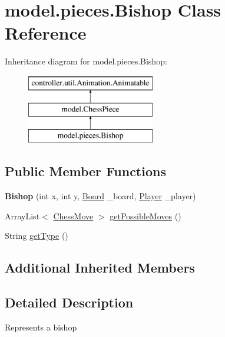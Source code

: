 \hypertarget{classmodel_1_1pieces_1_1_bishop}{\section{model.\-pieces.\-Bishop Class Reference}
\label{classmodel_1_1pieces_1_1_bishop}
}
Inheritance diagram for model.\-pieces.\-Bishop\-:\begin{figure}[H]
\begin{center}
\leavevmode
\includegraphics[height=3.000000cm]{classmodel_1_1pieces_1_1_bishop}
\end{center}
\end{figure}
\subsection*{Public Member Functions}
\begin{DoxyCompactItemize}
\item 
\hypertarget{classmodel_1_1pieces_1_1_bishop_ae2668ef3ed3019d746808223561010da}{{\bfseries Bishop} (int x, int y, \hyperlink{classmodel_1_1board_1_1_board}{Board} \-\_\-board, \hyperlink{classcontroller_1_1_player}{Player} \-\_\-player)}\label{classmodel_1_1pieces_1_1_bishop_ae2668ef3ed3019d746808223561010da}

\item 
Array\-List$<$ \hyperlink{classmodel_1_1_chess_move}{Chess\-Move} $>$ \hyperlink{classmodel_1_1pieces_1_1_bishop_a833d5968dbfb775dc72d1cadb68242b3}{get\-Possible\-Moves} ()
\item 
String \hyperlink{classmodel_1_1pieces_1_1_bishop_af15a1172b7ec3d8e895d519f8e540d1c}{get\-Type} ()
\end{DoxyCompactItemize}
\subsection*{Additional Inherited Members}


\subsection{Detailed Description}
Represents a bishop

